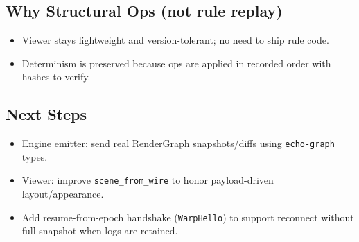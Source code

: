 \subsection{Why Structural Ops (not rule replay)}
\begin{itemize}
  \item Viewer stays lightweight and version-tolerant; no need to ship rule code.
  \item Determinism is preserved because ops are applied in recorded order with hashes to verify.
\end{itemize}

\subsection{Next Steps}
\begin{itemize}
  \item Engine emitter: send real RenderGraph snapshots/diffs using \texttt{echo-graph} types.
  \item Viewer: improve \texttt{scene\_from\_wire} to honor payload-driven layout/appearance.
  \item Add resume-from-epoch handshake (\texttt{WarpHello}) to support reconnect without full snapshot when logs are retained.
\end{itemize}
